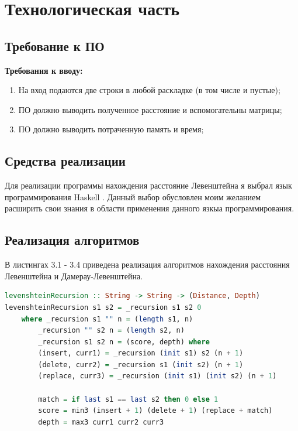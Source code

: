 \documentclass[12pt]{report}
\begin{document}
\chapter{Технологическая часть}

\section{Требование к ПО}
\textbf{Требования к вводу:}
\begin{enumerate}
	\item На вход подаются две строки в любой раскладке (в том числе и пустые);
	\item ПО должно выводить полученное расстояние и вспомогательны матрицы;
	\item ПО должно выводить потраченную память и время;
\end{enumerate}

\section{Средства реализации}
Для реализации программы нахождения расстояние Левенштейна я выбрал язык программирования Haskell \cite{Haskell}. Данный
выбор обусловлен моим желанием расширить свои знания в области
применения данного язкыа программирования.

\section{Реализация алгоритмов}

В листингах 3.1 - 3.4 приведена реализация алгоритмов нахождения расстояния Левенштейна и Дамерау-Левенштейна.

\begin{lstlisting}[label=some-code,caption=Функция нахождения расстояния Левенштейна рекурсивно,language=Haskell]
levenshteinRecursion :: String -> String -> (Distance, Depth)
levenshteinRecursion s1 s2 = _recursion s1 s2 0
	where _recursion s1 "" n = (length s1, n)
		_recursion "" s2 n = (length s2, n)
		_recursion s1 s2 n = (score, depth) where
		(insert, curr1) = _recursion (init s1) s2 (n + 1)
		(delete, curr2) = _recursion s1 (init s2) (n + 1)
		(replace, curr3) = _recursion (init s1) (init s2) (n + 1)

		match = if last s1 == last s2 then 0 else 1
		score = min3 (insert + 1) (delete + 1) (replace + match)
		depth = max3 curr1 curr2 curr3
\end{lstlisting}
\end{document}
